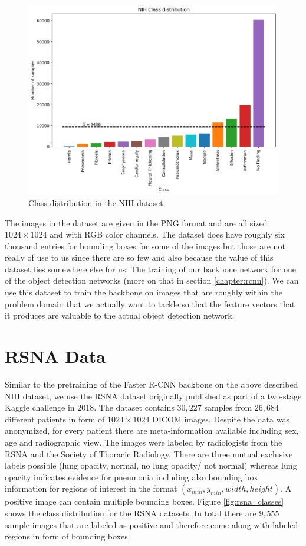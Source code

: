 \begin{figure}
	\centering
	\includegraphics[width=.8\linewidth]{img/nih_class_distribution.png}
	\caption{Class distribution in the NIH dataset}
	\label{fig:nih_classes}
\end{figure}

The images in the dataset are given in the PNG format and are all sized $1024 \times 1024$ and with RGB color channels. The dataset does have roughly six thousand entries for bounding boxes for some of the images but those are not really of use to us since there are so few and also because the value of this dataset lies somewhere else for us: The training of our backbone network for one of the object detection networks (more on that in section \vref{chapter:rcnn}). We can use this dataset to train the backbone on images that are roughly within the problem domain that we actually want to tackle so that the feature vectors that it produces are valuable to the actual object detection network. 

\section{RSNA Data}\label{data:rsna}

Similar to the pretraining of the Faster \ac{R-CNN} backbone on the above described NIH dataset, we use the RSNA dataset \autocite{RSNAKaeggle} originally published as part of a two-stage Kaggle challenge in 2018. The dataset contains $30,227$ samples from $26,684$ different patients in form of $1024 \times 1024$ DICOM images. Despite the data was anonymized, for every patient there are meta-information available including sex, age and radiographic view. The images were labeled by radiologists from the \ac{RSNA} and the Society of Thoracic Radiology. There are three mutual exclusive  labels possible (lung opacity, normal, no lung opacity/ not normal) whereas lung opacity indicates evidence for pneumonia including also bounding box information for regions of interest in the format $(x_{min}, y_{min}, width, height)$. A positive image can contain multiple bounding boxes. Figure \ref{fig:rsna_classes} shows the class distribution for the \ac{RSNA} datasets. In total there are $9,555$ sample images that are labeled as positive and therefore come along with labeled regions in form of bounding boxes.


